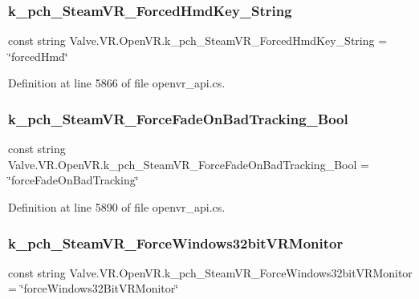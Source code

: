 \subsubsection{\texorpdfstring{k\_pch\_SteamVR\_ForcedHmdKey\_String}{k\_pch\_SteamVR\_ForcedHmdKey\_String}}
{\footnotesize\ttfamily const string Valve.\+V\+R.\+Open\+V\+R.\+k\+\_\+pch\+\_\+\+Steam\+V\+R\+\_\+\+Forced\+Hmd\+Key\+\_\+\+String = \char`\"{}forced\+Hmd\char`\"{}}



Definition at line 5866 of file openvr\+\_\+api.\+cs.

\mbox{\label{class_valve_1_1_v_r_1_1_open_v_r_a5a6e3cef9467c8529f6fdbbb640fe5d7}} 
\subsubsection{\texorpdfstring{k\_pch\_SteamVR\_ForceFadeOnBadTracking\_Bool}{k\_pch\_SteamVR\_ForceFadeOnBadTracking\_Bool}}
{\footnotesize\ttfamily const string Valve.\+V\+R.\+Open\+V\+R.\+k\+\_\+pch\+\_\+\+Steam\+V\+R\+\_\+\+Force\+Fade\+On\+Bad\+Tracking\+\_\+\+Bool = \char`\"{}force\+Fade\+On\+Bad\+Tracking\char`\"{}}



Definition at line 5890 of file openvr\+\_\+api.\+cs.

\mbox{\label{class_valve_1_1_v_r_1_1_open_v_r_a4b7e89de1a947f109e3d7244e3a04546}} 
\subsubsection{\texorpdfstring{k\_pch\_SteamVR\_ForceWindows32bitVRMonitor}{k\_pch\_SteamVR\_ForceWindows32bitVRMonitor}}
{\footnotesize\ttfamily const string Valve.\+V\+R.\+Open\+V\+R.\+k\+\_\+pch\+\_\+\+Steam\+V\+R\+\_\+\+Force\+Windows32bit\+V\+R\+Monitor = \char`\"{}force\+Windows32\+Bit\+V\+R\+Monitor\char`\"{}}



